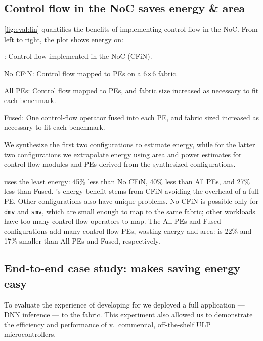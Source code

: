 \subsection{Control flow in the NoC saves energy \& area}
\label{sec:eval:fin}
\autoref{fig:eval:fin} quantifies the benefits of implementing control flow in the NoC.
% 
From left to right, the plot shows energy on:
\begin{compactitem}
\item \riptide: Control flow implemented in the NoC (CFiN).
\item No CFiN: Control flow mapped to PEs on a 6$\times$6 fabric.
\item All PEs: Control flow mapped to PEs, and fabric size increased as necessary to fit each benchmark.
\item Fused: One control-flow operator fused into each PE, and fabric sized increased as necessary to fit each benchmark.
\end{compactitem}
% 
We synthesize the first two configurations to estimate energy, while for the latter two configurations we extrapolate energy using area and power estimates for control-flow modules and PEs derived from the synthesized configurations.
 
\riptide uses the least energy: 45\% less than No CFiN, 40\% less than All PEs, and 27\% less than Fused.
% 
\riptide's energy benefit stems from CFiN avoiding the overhead of a full PE.
%
Other configurations also have unique problems.
% 
No-CFiN is possible only for {\tt dmv} and {\tt smv}, which are small enough to map to the
same \riptide fabric; other workloads have too many control-flow operators to map.
% 
The All PEs and Fused configurations add many control-flow PEs, wasting energy and area:
% 
\riptide is 22\% and 17\% smaller than All PEs and Fused, respectively.

\subsection{End-to-end case study: \riptide makes saving energy easy}
\label{eval:end2end}
% 
To evaluate the experience of developing for \riptide we deployed a full application --- DNN inference --- to the fabric.
% 
This experiment also allowed us to demonstrate the efficiency and performance of \riptide v.\ commercial, off-the-shelf ULP microcontrollers.

